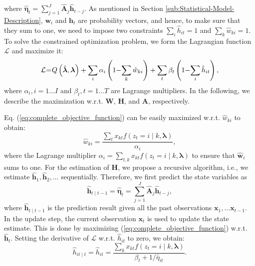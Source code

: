 \documentclass[10pt,twocolumn,twoside] {IEEEtran}
\begin{document}
where $\hat{\boldsymbol{\eta}}_{t}=\sum_{j=1}^{J}\hat{\mathbf{A}}_{j}\hat{\mathbf{h}}_{t-j}$.
As mentioned in Section \ref{sub:Statistical-Model-Description}, $\mathbf{w}_{i}$ and $\mathbf{h}_{t}$
are probability vectors, and hence, to make sure that they sum to one, we need to impose two constraints $\sum_{i}\hat{h}_{it}=1$ and $\sum_{k}\hat{w}_{ki}=1$. To solve the constrained optimization problem, we form the Lagrangian function $\mathcal{L}$ and maximize it:
\begin{equation}
\mathcal{L}\hspace{-.8mm}=\hspace{-.8mm}Q\left(\hat{\boldsymbol{\lambda}},\boldsymbol{\lambda}\right)+
\sum_{i}\alpha_{i}\left(1\hspace{-.8mm}-\hspace{-.8mm}\sum_{k}\hat{w}_{ki}\right)+\sum_{t}\beta_{t}\left(1\hspace{-.8mm}-\hspace{-.8mm}\sum_{i}\hat{h}_{it}\right),
\label{eq:complete_objective_function}
\end{equation}
where $\alpha_i,i=1\ldots I$ and $\beta_t,t=1\ldots T$ are Lagrange multipliers. In the following,
we describe the maximization w.r.t. $\mathbf{W}$, $\mathbf{H}$,
and $\mathbf{A}$, respectively.

Eq. (\ref{eq:complete_objective_function}) can be easily maximized
w.r.t. $\hat{w}_{ki}$ to obtain:
\begin{equation}
\hat{w}_{ki}=\frac{\sum_{t}x_{kt}f\left(z_{t}=i\mid k,\boldsymbol{\lambda}\right)}{\alpha_{i}},\label{eq:basis_estimate}
\end{equation}
where the Lagrange multiplier $\alpha_{i}=\sum_{t,k}x_{kt}f\left(z_{t}=i\mid k,\boldsymbol{\lambda}\right)$
to ensure that $\hat{\mathbf{w}}_{i}$ sums to one. For the estimation
of $\mathbf{H}$, we propose a recursive algorithm, i.e., we estimate
$\hat{\mathbf{h}}_{1},\hat{\mathbf{h}}_{2},\ldots$ sequentially.
Therefore, we first predict the state variables as
\begin{equation}
\hat{\mathbf{h}}_{t\mid t-1}=\hat{\boldsymbol{\eta}}_{t}=\sum_{j=1}^{J}\hat{\mathbf{A}}_{j}\hat{\mathbf{h}}_{t-j},\label{eq:predict_h}
\end{equation}
where $\hat{\mathbf{h}}_{t\mid t-1}$ is the  prediction result given all the past observations $\mathbf{x}_{1},\ldots\mathbf{x}_{t-1}$.
In the update step, the current observation $\mathbf{x}_{t}$ is used
to update the state estimate. This is done by maximizing (\ref{eq:complete_objective_function})
w.r.t. $\hat{\mathbf{h}}_{t}$. Setting the derivative of $\mathcal{L}$
w.r.t. $\hat{h}_{it}$ to zero, we obtain:
\begin{equation}
\hat{h}_{it\mid t}=\hat{h}_{it}=\frac{\sum_{k}x_{kt}f\left(z_{t}=i\mid k,\boldsymbol{\lambda}\right)}{\beta_{t}+1/\hat{\eta}_{it}}.\label{eq:update_h}
\end{equation}
\end{document}
